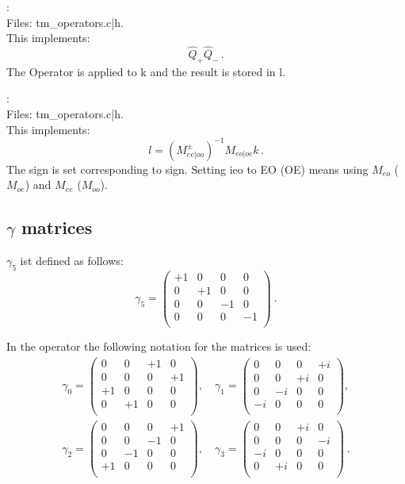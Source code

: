 :\\
Files: {\ttfamily tm\_operators.c|h}.\\
This implements:
\[
\hat Q_{+} \hat Q_{-}\, .
\]
The Operator is applied to {\ttfamily k} and the result is stored in
{\ttfamily l}.

:\\
Files:  {\ttfamily tm\_operators.c|h}.\\
This implements:
\[
l = (M_{ee|oo}^\pm)^{-1} M_{eo|oe} k\, .
\]
The sign is set corresponding to {\ttfamily sign}. Setting {\ttfamily
  ieo} to {\ttfamily EO} ({\ttfamily OE}) means using $M_{eo}$
($M_{oe}$) and $M_{ee}$ ($M_{oo}$).

\subsection{$\gamma$ matrices}

$\gamma_5$ ist defined as follows:
\[
  \gamma_5 =
  \begin{pmatrix}
    +1 & 0 & 0 & 0 \\
    0 & +1 & 0 & 0 \\
    0 & 0 & -1 & 0 \\
    0 & 0 & 0 & -1 \\    
  \end{pmatrix}\ .
\]

In the operator the following notation for
the matrices is used:
\[
\begin{split}
  \gamma_0 = \begin{pmatrix}
    0 & 0 & +1 & 0 \\
    0 & 0 & 0 & +1 \\
    +1 & 0 & 0 & 0 \\
    0 & +1 & 0 & 0 \\
  \end{pmatrix},\quad
  \gamma_1 =\begin{pmatrix}
    0 & 0 & 0 & +i \\
    0 & 0 & +i & 0 \\
    0 & -i & 0 & 0 \\
    -i & 0 & 0 & 0 \\    
  \end{pmatrix},\\
  \gamma_2 = \begin{pmatrix}
    0 & 0 & 0 & +1 \\
    0 & 0 & -1 & 0 \\
    0 & -1 & 0 & 0 \\
    +1 & 0 & 0 & 0 \\   
  \end{pmatrix},\quad
  \gamma_3 =\begin{pmatrix}
    0 & 0 & +i & 0 \\
    0 & 0 & 0 & -i \\
    -i & 0 & 0 & 0 \\
    0 & +i & 0 & 0 \\
  \end{pmatrix}\ .\\
\end{split}
\]



